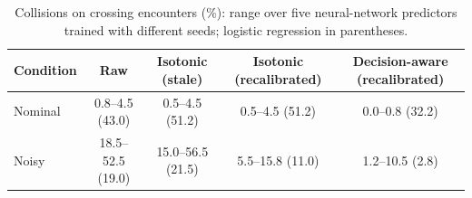 \begin{table}[t]
\centering
\caption{Collisions on crossing encounters (\%): range over five neural-network predictors trained with different seeds; logistic regression in parentheses.}
\label{tab:robustness}
\begin{tabular}{lcccc}
\toprule
Condition & Raw & Isotonic (stale) & Isotonic (recalibrated) & Decision-aware (recalibrated) \\
\midrule
Nominal & 0.8--4.5 (43.0) & 0.5--4.5 (51.2) & 0.5--4.5 (51.2) & 0.0--0.8 (32.2) \\
Noisy & 18.5--52.5 (19.0) & 15.0--56.5 (21.5) & 5.5--15.8 (11.0) & 1.2--10.5 (2.8) \\
\bottomrule
\end{tabular}
\end{table}

